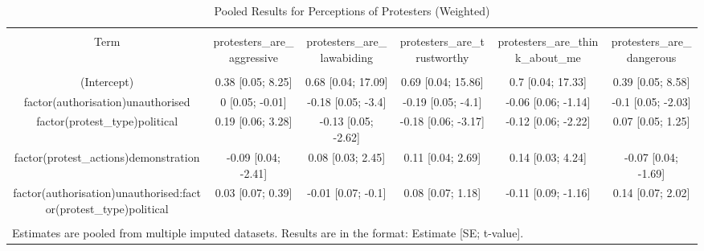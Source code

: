 
\begin{table}[!htbp] \centering 
  \caption{Pooled Results for Perceptions of Protesters (Weighted)} 
  \label{} 
\begin{tabular}{@{\extracolsep{5pt}} cccccc} 
\\[-1.8ex]\hline 
\hline \\[-1.8ex] 
Term & protesters\_are\_aggressive & protesters\_are\_lawabiding & protesters\_are\_trustworthy & protesters\_are\_think\_about\_me & protesters\_are\_dangerous \\ 
\hline \\[-1.8ex] 
(Intercept) & 0.38 [0.05; 8.25] & 0.68 [0.04; 17.09] & 0.69 [0.04; 15.86] & 0.7 [0.04; 17.33] & 0.39 [0.05; 8.58] \\ 
factor(authorisation)unauthorised & 0 [0.05; -0.01] & -0.18 [0.05; -3.4] & -0.19 [0.05; -4.1] & -0.06 [0.06; -1.14] & -0.1 [0.05; -2.03] \\ 
factor(protest\_type)political & 0.19 [0.06; 3.28] & -0.13 [0.05; -2.62] & -0.18 [0.06; -3.17] & -0.12 [0.06; -2.22] & 0.07 [0.05; 1.25] \\ 
factor(protest\_actions)demonstration & -0.09 [0.04; -2.41] & 0.08 [0.03; 2.45] & 0.11 [0.04; 2.69] & 0.14 [0.03; 4.24] & -0.07 [0.04; -1.69] \\ 
factor(authorisation)unauthorised:factor(protest\_type)political & 0.03 [0.07; 0.39] & -0.01 [0.07; -0.1] & 0.08 [0.07; 1.18] & -0.11 [0.09; -1.16] & 0.14 [0.07; 2.02] \\ 
\hline \\[-1.8ex] 
\multicolumn{6}{l}{Estimates are pooled from multiple imputed datasets. Results are in the format: Estimate [SE; t-value].} \\ 
\end{tabular} 
\end{table} 
